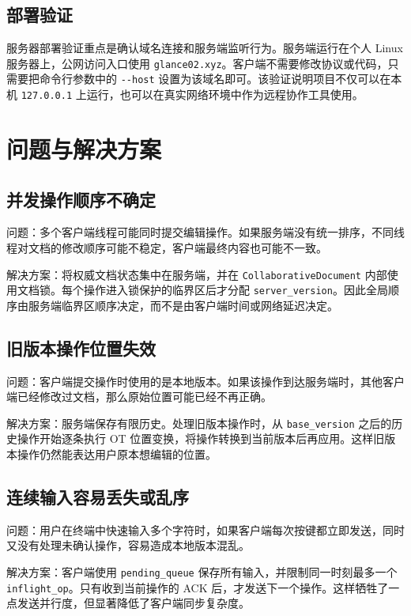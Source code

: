\subsection{部署验证}

服务器部署验证重点是确认域名连接和服务端监听行为。服务端运行在个人 Linux 服务器上，公网访问入口使用 \verb|glance02.xyz|。客户端不需要修改协议或代码，只需要把命令行参数中的 \verb|--host| 设置为该域名即可。该验证说明项目不仅可以在本机 \verb|127.0.0.1| 上运行，也可以在真实网络环境中作为远程协作工具使用。

\section{问题与解决方案}

\subsection{并发操作顺序不确定}

问题：多个客户端线程可能同时提交编辑操作。如果服务端没有统一排序，不同线程对文档的修改顺序可能不稳定，客户端最终内容也可能不一致。

解决方案：将权威文档状态集中在服务端，并在 \verb|CollaborativeDocument| 内部使用文档锁。每个操作进入锁保护的临界区后才分配 \verb|server_version|。因此全局顺序由服务端临界区顺序决定，而不是由客户端时间或网络延迟决定。

\subsection{旧版本操作位置失效}

问题：客户端提交操作时使用的是本地版本。如果该操作到达服务端时，其他客户端已经修改过文档，那么原始位置可能已经不再正确。

解决方案：服务端保存有限历史。处理旧版本操作时，从 \verb|base_version| 之后的历史操作开始逐条执行 OT 位置变换，将操作转换到当前版本后再应用。这样旧版本操作仍然能表达用户原本想编辑的位置。

\subsection{连续输入容易丢失或乱序}

问题：用户在终端中快速输入多个字符时，如果客户端每次按键都立即发送，同时又没有处理未确认操作，容易造成本地版本混乱。

解决方案：客户端使用 \verb|pending_queue| 保存所有输入，并限制同一时刻最多一个 \verb|inflight_op|。只有收到当前操作的 ACK 后，才发送下一个操作。这样牺牲了一点发送并行度，但显著降低了客户端同步复杂度。

